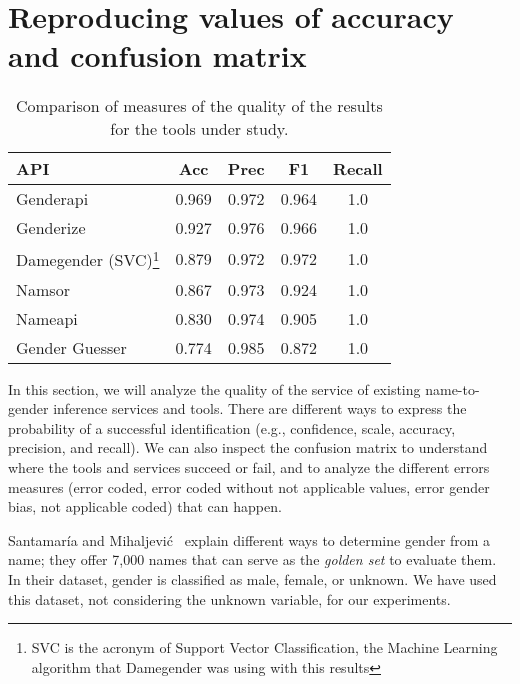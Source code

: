 \documentclass[a4paper]{article}
\begin{document}
\section{Reproducing values of accuracy and confusion matrix}
\label{sec:reproducing}

\begin{table}[t]
\footnotesize
\begin{tabular}[]{lcccc}
  \hline
  API & Acc & Prec & F1 & Recall\tabularnewline
\hline
Genderapi & 0.969 & 0.972 & 0.964 & 1.0\tabularnewline
Genderize & 0.927 & 0.976 & 0.966 & 1.0\tabularnewline
Damegender (SVC)\footnote{SVC is the acronym of Support Vector Classification, the Machine Learning algorithm that Damegender was using with this results} & 0.879 & 0.972 & 0.972 & 1.0\tabularnewline
Namsor & 0.867 & 0.973 & 0.924 & 1.0\tabularnewline
Nameapi & 0.830 & 0.974 & 0.905 & 1.0\tabularnewline
Gender Guesser & 0.774 & 0.985 & 0.872 & 1.0\tabularnewline
\hline
\end{tabular}
\caption{Comparison of measures of the quality of the results for the tools under study.}
\label{table:DifferentAccuraciesMeasures}
\end{table}

In this section, we will analyze the quality of the service of existing name-to-gender inference services and tools.
There are different ways to express the probability of a successful identification (e.g., confidence, scale, accuracy, precision, and recall).
We can also inspect the confusion matrix to understand where the tools and services succeed or fail, and to analyze the different errors measures (error coded, error coded without not applicable values, error gender bias, not applicable coded) that can happen.

Santamaría and Mihaljevi\'c~\cite{10.7717/peerj-cs.156} explain different ways to determine gender from a name; they offer 7,000 names that can serve as the \emph{golden set} to evaluate them. 
In their dataset, gender is classified as male, female, or unknown. 
We have used this dataset, not considering the unknown variable, for our experiments.
\end{document}
